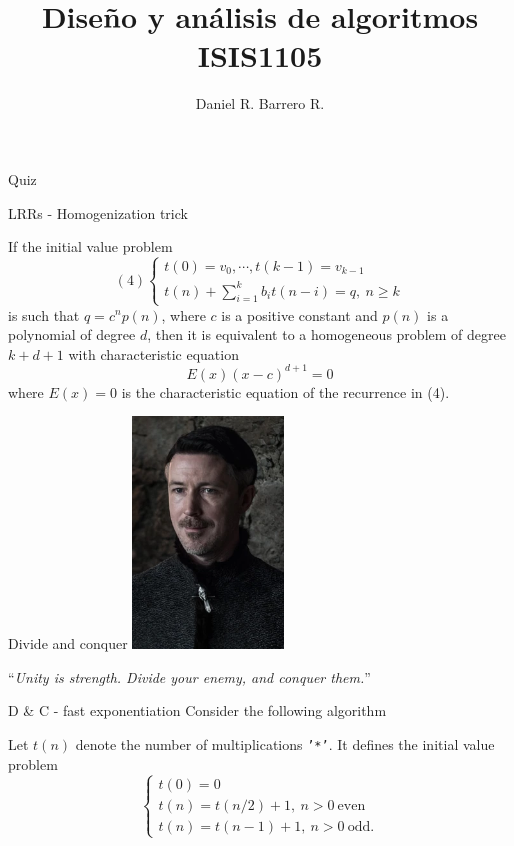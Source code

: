 \documentclass{beamer}
\title{Diseño y análisis de algoritmos \\ ISIS1105}
\author{Daniel R. Barrero R.}
\institute{Universidad de los Andes}
\begin{document}
\frame{\titlepage}

%

\begin{frame}{Quiz}
\end{frame}

%

\begin{frame}{LRRs - Homogenization trick}
	\begin{thm}[2]\label{ht}
		If the initial value problem
		\begin{displaymath}(4)
			\begin{cases}
				t(0)= v_0, \cdots, t(k-1)= v_{k-1}\\
				t(n) + \sum_{i= 1}^k b_it(n-i)= q,\ n \geq k
			\end{cases}
		\end{displaymath}
		is such that $q = c^np(n)$, where $c$ is a positive constant and
		$p(n)$ is a polynomial of degree $d$, then it is equivalent to a
		homogeneous problem of degree $k+d+1$ with characteristic equation
		\begin{equation*}
			E(x)(x-c)^{d+1} = 0
		\end{equation*}
		where $E(x) = 0$ is the characteristic equation of the recurrence
		in (4).
	\end{thm}
\end{frame}

\begin{frame}{Divide and conquer}
	\centering
	\includegraphics[width=0.3\textwidth]{strategist.png}
	
	\bigskip
	``\emph{Unity is strength. Divide your enemy, and conquer them.}''
\end{frame}

%

\begin{frame}{D \& C - fast exponentiation}
	Consider the following algorithm
	
	
	
	Let $t(n)$ denote the number of multiplications \texttt{'*'}. It defines the
	initial value problem
	\[
		\begin{cases}
			t(0)= 0\\
			t(n)= t(n/2) + 1,\ n > 0\ \text{even}\\
			t(n)= t(n-1) + 1,\ n > 0\ \text{odd}.
		\end{cases}
	\]
\end{frame}
\end{document}
